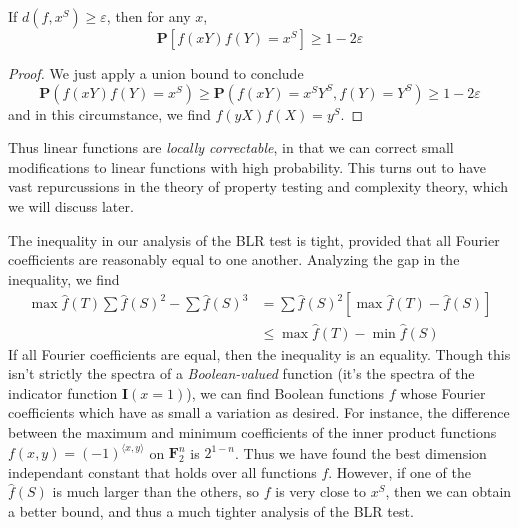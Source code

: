 \begin{theorem}
    If $d(f,x^S) \geq \varepsilon$, then for any $x$,
    \[ \mathbf{P}[f(xY)f(Y) = x^S] \geq 1 - 2 \varepsilon \]
\end{theorem}
\begin{proof}
    We just apply a union bound to conclude
    \[ \mathbf{P}(f(xY)f(Y) = x^S) \geq \mathbf{P}(f(xY) = x^SY^S, f(Y) = Y^S) \geq 1 - 2\varepsilon \]
    and in this circumstance, we find $f(yX)f(X) = y^S$.
\end{proof}

Thus linear functions are {\it locally correctable}, in that we can correct small modifications to linear functions with high probability. This turns out to have vast repurcussions in the theory of property testing and complexity theory, which we will discuss later.

The inequality in our analysis of the BLR test is tight, provided that all Fourier coefficients are reasonably equal to one another. Analyzing the gap in the inequality, we find
%
\begin{align*}
    \max \widehat{f}(T) \sum \widehat{f}(S)^2 - \sum \widehat{f}(S)^3 &= \sum \widehat{f}(S)^2 [\max \widehat{f}(T) - \widehat{f}(S)]\\
    &\leq \max \widehat{f}(T) - \min \widehat{f}(S)
\end{align*}
%
If all Fourier coefficients are equal, then the inequality is an equality. Though this isn't strictly the spectra of a {\it Boolean-valued} function (it's the spectra of the indicator function $\mathbf{I}(x = 1)$), we can find Boolean functions $f$ whose Fourier coefficients which have as small a variation as desired. For instance, the difference between the maximum and minimum coefficients of the inner product functions $f(x,y) = (-1)^{\langle x, y \rangle}$ on $\mathbf{F}_2^n$ is $2^{1-n}$. Thus we have found the best dimension independant constant that holds over all functions $f$. However, if one of the $\widehat{f}(S)$ is much larger than the others, so $f$ is very close to $x^S$, then we can obtain a better bound, and thus a much tighter analysis of the BLR test.

